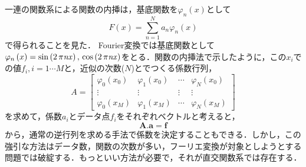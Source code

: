 一連の関数系による関数の内挿は，基底関数を$\varphi_n(x)$として
\begin{equation*}
F(x) = \sum^N_{n=1}a_n \varphi_n(x)
\end{equation*}
で得られることを見た．
Fourier変換では基底関数として$\varphi _{n} \left( x \right) =\sin \left( 2\,\pi {\it nx} \right) ,\,\cos \left( 2\,\pi {\it nx} \right)$をとる．関数の内挿法で示したように，この$x_i$での値$f_i, i=1 \cdots M$と，近似の次数($N$)とでつくる係数行列，
\begin{equation*}
A=\left[ \begin{array}{cccc}
\varphi_0(x_0)&\varphi_1(x_0)& \cdots &\varphi_N(x_0) \\
\vdots & \vdots & \vdots & \vdots \\
\varphi_0(x_M)&\varphi_1(x_M)& \cdots &\varphi_N(x_M) 
\end{array}\right]
\end{equation*}
を求めて，係数$a_i$とデータ点$f_i$をそれぞれベクトルと考えると，
\begin{equation*}
\boldsymbol{A}.\boldsymbol{a} = \boldsymbol{f}
\end{equation*}
から，通常の逆行列を求める手法で係数を決定することもできる．しかし，この強引な方法はデータ数，関数の次数が多い，フーリエ変換が対象としようとする問題では破綻する．もっといい方法が必要で，それが直交関数系では存在する．
